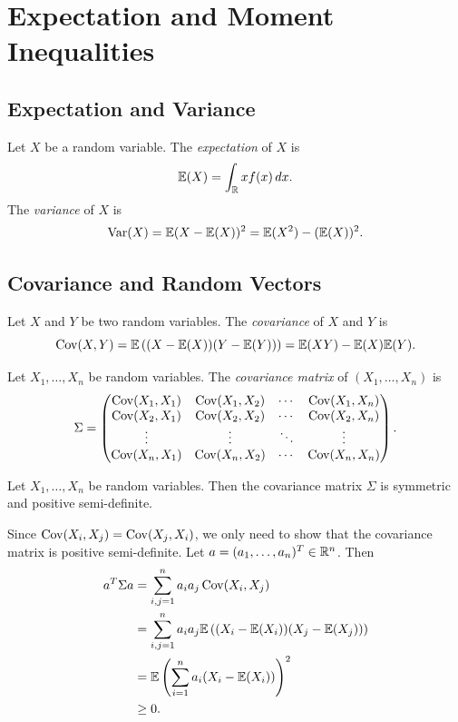 \chapter{Expectation and Moment Inequalities}

\section{Expectation and Variance}

\begin{definitionbox}
    Let $X$ be a random variable.
    The \emph{expectation} of $X$ is
    $$\mathbb{E}(X) = \int_{\mathbb{R}} xf(x)\, dx.$$
    The \emph{variance} of $X$ is
    $$\operatorname{\mathrm{Var}}(X) = \mathbb{E}(X - \mathbb{E}(X))^2 = \mathbb{E}(X^2) - (\mathbb{E}(X))^2.$$
\end{definitionbox}

\section{Covariance and Random Vectors}

\begin{definitionbox}[Covariance]
    Let $X$ and $Y$ be two random variables. The \emph{covariance} of $X$ and $Y$ is
    $$\operatorname{\mathrm{Cov}}(X,Y) = \mathbb{E}\left((X - \mathbb{E}(X))(Y - \mathbb{E}(Y))\right) = \mathbb{E}(XY) - \mathbb{E}(X)\mathbb{E}(Y).$$

    Let $X_1, \ldots, X_n$ be random variables. The \emph{covariance matrix} of $(X_1, \ldots, X_n)$ is
    $$\Sigma = \begin{pmatrix}
        \operatorname{\mathrm{Cov}}(X_1, X_1) & \operatorname{\mathrm{Cov}}(X_1, X_2) & \cdots & \operatorname{\mathrm{Cov}}(X_1, X_n) \\
        \operatorname{\mathrm{Cov}}(X_2, X_1) & \operatorname{\mathrm{Cov}}(X_2, X_2) & \cdots & \operatorname{\mathrm{Cov}}(X_2, X_n) \\
        \vdots & \vdots & \ddots & \vdots \\
        \operatorname{\mathrm{Cov}}(X_n, X_1) & \operatorname{\mathrm{Cov}}(X_n, X_2) & \cdots & \operatorname{\mathrm{Cov}}(X_n, X_n)
    \end{pmatrix}.$$
\end{definitionbox}

\begin{propositionbox}
    Let $X_1, \ldots, X_n$ be random variables. Then the covariance matrix $\Sigma$ is symmetric and positive semi-definite.
\end{propositionbox}
\begin{proofbox}
    Since $\operatorname{\mathrm{Cov}}(X_i, X_j) = \operatorname{\mathrm{Cov}}(X_j, X_i)$, we only need to show that the covariance matrix is positive semi-definite.
    Let $a = (a_1, \ldots, a_n)^T \in \mathbb{R}^n$. Then
    $$\begin{aligned}
        a^T \Sigma a &= \sum_{i,j=1}^{n} a_i a_j \operatorname{\mathrm{Cov}}(X_i, X_j) \\
        &= \sum_{i,j=1}^{n} a_i a_j \mathbb{E}\left((X_i - \mathbb{E}(X_i))(X_j - \mathbb{E}(X_j))\right) \\
        &= \mathbb{E}\left(\sum_{i=1}^{n} a_i (X_i - \mathbb{E}(X_i))\right)^2 \\
        &\geq 0.
    \end{aligned}$$
\end{proofbox}

